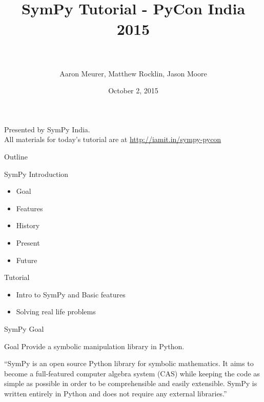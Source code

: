 \documentclass[xcolor=svgnames]{beamer}
\title[SymPy\hspace{4em}\insertframenumber/
  \inserttotalframenumber]{~\\ SymPy Tutorial - PyCon India 2015\\~}
\author[A. Meurer, Matthew Rocklin, Jason Moore]
  {Aaron Meurer, Matthew Rocklin, Jason Moore}
\institute{\pgfuseimage{mylogo}}
\date{October 2, 2015}
\begin{document}
  \begin{frame}
    \maketitle
  \begin{center}
  \normalsize Presented by SymPy India.\\ All materials for today's tutorial are at \url{http://iamit.in/sympy-pycon}
  \end{center}
  \end{frame}
  
  \begin{frame}{Outline}
    \begin{block}{SymPy Introduction}
      \begin{itemize}
      \item Goal
      \item Features
      \item History
      \item Present
      \item Future
      \end{itemize}
    \end{block}

    \begin{block}{Tutorial}
      \begin{itemize}
      \item Intro to SymPy and Basic features
      \item Solving real life problems
      \end{itemize}
    \end{block}
  \end{frame}

  \begin{frame}{SymPy Goal}
    \begin{block}{Goal}
      Provide a symbolic manipulation library in Python.
    \end{block}
    \begin{block}

      ``SymPy is an open source Python library for symbolic mathematics. It aims to
      become a full-featured computer algebra system (CAS) while keeping the code as
      simple as possible in order to be comprehensible and easily extensible. SymPy
      is written entirely in Python and does not require any external libraries.''

    \end{block}
  \end{frame}
\end{document}
